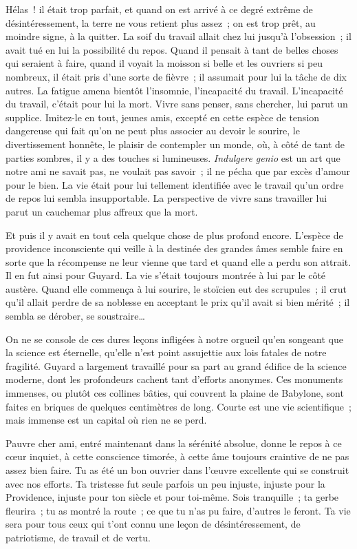 \documentclass[french,twoside]{book} %
\newcommand\foreign[1]{\emph{#1}}
\newcommand\persName[1]{#1}
\newcommand\placeName[1]{#1}
\begin{document}
Hélas ! il était trop parfait, et quand on est arrivé à ce degré extrême de désintéressement, la terre ne vous retient plus assez ; on est trop prêt, au moindre signe, à la quitter. La soif du travail allait chez lui jusqu’à l’obsession ; il avait tué en lui la possibilité du repos. Quand il pensait à tant de belles choses qui seraient à faire, quand il voyait la moisson si belle et les ouvriers si peu nombreux, il était pris d’une sorte de fièvre ; il assumait pour lui la tâche de dix autres. La fatigue amena bientôt l’insomnie, l’incapacité du travail. L’incapacité du travail, c’était pour lui la mort. Vivre sans penser, sans chercher, lui parut un supplice. Imitez-le en tout, jeunes amis, excepté en cette espèce de tension dangereuse qui fait qu’on ne peut plus associer au devoir le sourire, le divertissement honnête, le plaisir de contempler un monde, où, à côté de tant de parties sombres, il y a des touches si lumineuses. \foreign{{\itshape Indulgere genio}} est un art que notre ami ne savait pas, ne voulait pas savoir ; il ne pécha que par excès d’amour pour le bien. La vie était pour lui tellement identifiée avec le travail qu’un ordre de repos lui sembla insupportable. La perspective de vivre sans travailler lui parut un cauchemar plus affreux que la mort.\par
Et puis il y avait en tout cela quelque chose de plus profond encore. L’espèce de providence inconsciente qui veille à la destinée des grandes âmes semble faire en sorte que la récompense ne leur vienne que tard et quand elle a perdu son attrait. Il en fut ainsi pour Guyard. La vie s’était toujours montrée à lui par le côté austère. Quand elle commença à lui sourire, le stoïcien eut des scrupules ; il crut qu’il allait perdre de sa noblesse en acceptant le prix qu’il avait si bien mérité ; il sembla se dérober, se soustraire…\par
On ne se console de ces dures leçons infligées à notre orgueil qu’en songeant que la science est éternelle, qu’elle n’est point assujettie aux lois fatales de notre fragilité. {\persName Guyard} a largement travaillé pour sa part au grand édifice de la science moderne, dont les profondeurs cachent tant d’efforts anonymes. Ces monuments immenses, ou plutôt ces collines bâties, qui couvrent la plaine de {\placeName Babylone}, sont faites en briques de quelques centimètres de long. Courte est une vie scientifique ; mais immense est un capital où rien ne se perd.\par
Pauvre cher ami, entré maintenant dans la sérénité absolue, donne le repos à ce cœur inquiet, à cette conscience timorée, à cette âme toujours craintive de ne pas assez bien faire. Tu as été un bon ouvrier dans l’œuvre excellente qui se construit avec nos efforts. Ta tristesse fut seule parfois un peu injuste, injuste pour la Providence, injuste pour ton siècle et pour toi-même. Sois tranquille ; ta gerbe fleurira ; tu as montré la route ; ce que tu n’as pu faire, d’autres le feront. Ta vie sera pour tous ceux qui t’ont connu une leçon de désintéressement, de patriotisme, de travail et de vertu.
\end{document}
